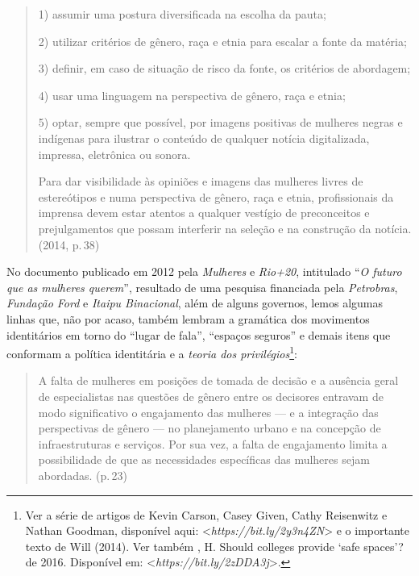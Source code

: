 \begin{quote}
\forceindent{}1) assumir uma postura diversificada na escolha da pauta;

2) utilizar critérios de gênero, raça e etnia para escalar a fonte da
matéria;

3) definir, em caso de situação de risco da fonte, os critérios de
abordagem;

4) usar uma linguagem na perspectiva de gênero, raça e etnia;

5) optar, sempre que possível, por imagens positivas de mulheres negras
e indígenas para ilustrar o conteúdo de qualquer notícia digitalizada,
impressa, eletrônica ou sonora.

Para dar visibilidade às opiniões e imagens das mulheres livres de
estereótipos e numa perspectiva de gênero, raça e etnia, profissionais
da imprensa devem estar atentos a qualquer vestígio de preconceitos e
prejulgamentos que possam interferir na seleção e na construção da
notícia. (2014, p.\,38)
\end{quote}

No documento publicado em 2012 pela \emph{ Mulheres} e \emph{Rio+20},
intitulado ``\emph{O futuro que as mulheres querem}'', resultado de uma
pesquisa financiada pela \emph{Petrobras}, \emph{Fundação Ford} e
\emph{Itaipu Binacional}, além de alguns governos, lemos algumas linhas
que, não por acaso, também lembram a gramática dos movimentos
identitários em torno do ``lugar de fala'', ``espaços seguros'' e demais
itens que conformam a política identitária e a \emph{teoria dos
privilégios}\footnote{Ver a série de artigos de Kevin Carson, Casey
  Given, Cathy Reisenwitz e Nathan Goodman, disponível aqui:
  \textless{}\emph{https://bit.ly/2y3n4ZN}\textgreater{} e o
  importante texto de Will (2014). Ver também , H. Should
  colleges provide `safe spaces'? de 2016. Disponível em:
  \textless{}\emph{https://bit.ly/2zDDA3j}\textgreater{}.}:

\begin{quote}
A falta de mulheres em posições de tomada de decisão e a ausência geral
de especialistas nas questões de gênero entre os decisores entravam de
modo significativo o engajamento das mulheres --- e a integração das
perspectivas de gênero --- no planejamento urbano e na concepção de
infraestruturas e serviços. Por sua vez, a falta de engajamento limita a
possibilidade de que as necessidades específicas das mulheres sejam
abordadas. (p.\,23)
\end{quote}

